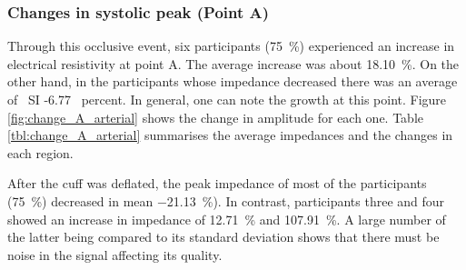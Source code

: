\subsubsection{Changes in systolic peak (Point A)}
\label{section results 3.2.1}
Through this occlusive event, six participants (\SI{75}{\percent}) experienced an increase in electrical resistivity at point A. The average increase was about \SI{18.10}{\percent}.  On the other hand, in the participants whose impedance decreased there was an average of \ SI {-6.77} {\ percent}. In general, one can note the growth at this point. Figure \ref{fig:change_A_arterial} shows the change in amplitude for each one. Table \ref{tbl:change_A_arterial} summarises the average impedances and the changes in each region. 

After the cuff was deflated, the peak impedance of most of the participants (\SI{75}{\percent})  decreased in mean \SI{-21.13}{\percent}).  In contrast, participants three and four showed an increase in impedance of \SI{12.71}{\percent} and \SI{107.91}{\percent}. A large number of the latter being compared to its standard deviation shows that there must be noise in the signal affecting its quality.   

